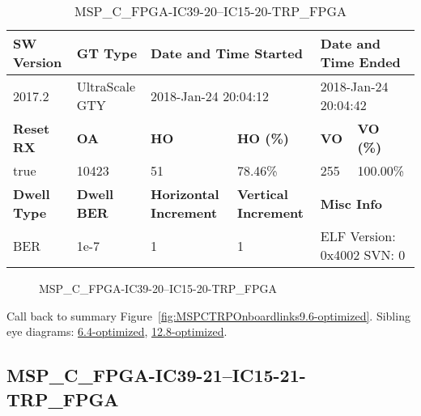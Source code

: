 \begin{table}[h]
\centering
\caption{MSP\_C\_FPGA-IC39-20--IC15-20-TRP\_FPGA}
\label{tab:MSPCFPGAIC3920IC1520TRPFPGA9.6-optimized}
\begin{tabular}{@{}|l|l|l|l|l|l|@{}}
\toprule
\textbf{SW Version}                & \textbf{GT Type}   & \multicolumn{2}{l|}{\textbf{Date and Time Started}}            & \multicolumn{2}{l|}{\textbf{Date and Time Ended}}        \\ \midrule
2017.2                       & UltraScale GTY          & \multicolumn{2}{l|}{2018-Jan-24 20:04:12}                   & \multicolumn{2}{l|}{2018-Jan-24 20:04:42}               \\ \midrule
\textbf{Reset RX}                  & \textbf{OA} & \textbf{HO}   & \textbf{HO (\%)} & \textbf{VO} & \textbf{VO (\%)} \\ \midrule
true & 10423        & 51          & 78.46\%        & 255        & 100.00\%       \\ \midrule
\textbf{Dwell Type}                & \textbf{Dwell BER} & \textbf{Horizontal Increment} & \textbf{Vertical Increment}    & \multicolumn{2}{l|}{\textbf{Misc Info}}                  \\ \midrule
BER                            & 1e-7        & 1        & 1           & \multicolumn{2}{l|}{ELF Version: 0x4002 SVN: 0}                         \\ \bottomrule
\end{tabular}
\end{table}

\begin{figure}[h]
\caption{MSP\_C\_FPGA-IC39-20--IC15-20-TRP\_FPGA} \label{fig:MSPCFPGAIC3920IC1520TRPFPGA9.6-optimized}
\end{figure}

Call back to summary Figure~\ref{fig:MSPCTRPOnboardlinks9.6-optimized}.
Sibling eye diagrams: \hyperref[sec:MSPCFPGAIC3920IC1520TRPFPGA6.4-optimized]{6.4-optimized}, \hyperref[sec:MSPCFPGAIC3920IC1520TRPFPGA12.8-optimized]{12.8-optimized}.

\clearpage
\newpage


\subsection{MSP\_C\_FPGA-IC39-21--IC15-21-TRP\_FPGA}\label{sec:MSPCFPGAIC3921IC1521TRPFPGA9.6-optimized}

